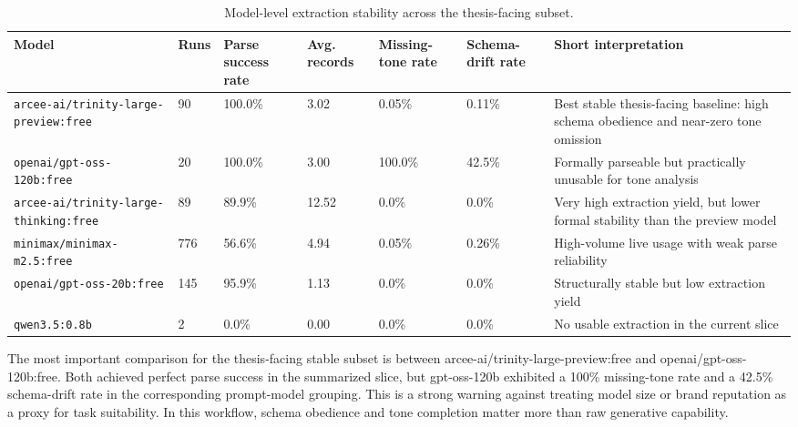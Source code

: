 \documentclass[english, online, cse, master]{dithesis}
\begin{document}
\begin{landscape}
\begin{table}[p]
\centering
\caption{Model-level extraction stability across the thesis-facing subset.}
\label{tab:model-level-extraction-stability}
\small
\renewcommand{\arraystretch}{1.2}
\begin{tabularx}{\linewidth}{|X|p{1.8cm}|p{1.8cm}|p{1.8cm}|p{1.8cm}|p{1.8cm}|X|}
\hline
\textbf{Model} & \textbf{Runs} & \textbf{Parse success rate} & \textbf{Avg. records} & \textbf{Missing-tone rate} & \textbf{Schema-drift rate} & \textbf{Short interpretation} \\ \hline

\texttt{arcee-ai/trinity-large-preview:free} & 90 & 100.0\% & 3.02 & 0.05\% & 0.11\%  & Best stable thesis-facing baseline: high schema obedience and near-zero tone omission \\ \hline
\texttt{openai/gpt-oss-120b:free} & 20 & 100.0\% & 3.00 & 100.0\% & 42.5\%  & Formally parseable but practically unusable for tone analysis \\ \hline
\texttt{arcee-ai/trinity-large-thinking:free} & 89 & 89.9\% & 12.52 & 0.0\% & 0.0\%  & Very high extraction yield, but lower formal stability than the preview model \\ \hline
\texttt{minimax/minimax-m2.5:free} & 776 & 56.6\% & 4.94 & 0.05\% & 0.26\%  & High-volume live usage with weak parse reliability \\ \hline
\texttt{openai/gpt-oss-20b:free} & 145 & 95.9\% & 1.13 & 0.0\% & 0.0\%  & Structurally stable but low extraction yield \\ \hline
\texttt{qwen3.5:0.8b} & 2 & 0.0\% & 0.00 & 0.0\% & 0.0\%  & No usable extraction in the current slice \\ \hline
\end{tabularx}
\end{table}
\end{landscape}




The most important comparison for the thesis-facing stable subset is between arcee-ai/trinity-large-preview:free and openai/gpt-oss-120b:free. Both achieved perfect parse success in the summarized slice, but gpt-oss-120b exhibited a 100\% missing-tone rate and a 42.5\% schema-drift rate in the corresponding prompt-model grouping. This is a strong warning against treating model size or brand reputation as a proxy for task suitability. In this workflow, schema obedience and tone completion matter more than raw generative capability.
\end{document}
